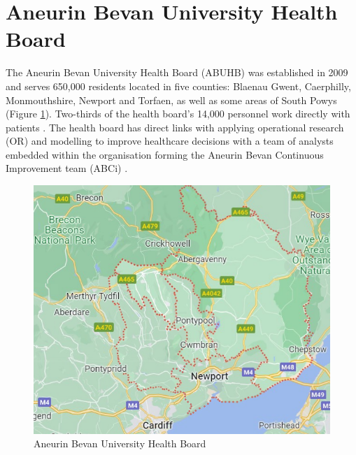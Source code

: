 \documentclass[../thesis.tex]{subfiles}
\begin{document}


\section{Aneurin Bevan University Health Board}\label{sec:ABUHB}

The Aneurin Bevan University Health Board (ABUHB) was established in 2009 and serves 650,000 residents located in five counties: Blaenau Gwent, Caerphilly, Monmouthshire, Newport and Torfaen, as well as some areas of South Powys (Figure \ref{fig:AbuhbCounties}). Two-thirds of the health board's 14,000 personnel work directly with patients \cite{UniAneurinBevanHealthBoardb}. The health board has direct links with applying operational research (OR) and modelling to improve healthcare decisions with a team of analysts embedded within the organisation forming the Aneurin Bevan Continuous Improvement team (ABCi) \cite{UniAneurinBevanHealthBoarda}.

\begin{figure}[h!]
    \centering
    \includegraphics[scale=0.8]{Chapters/Chapter1/Figures/ABUHBmap1.png}
    \caption{Aneurin Bevan University Health Board}
    \label{fig:AbuhbCounties}
\end{figure}
\end{document}
